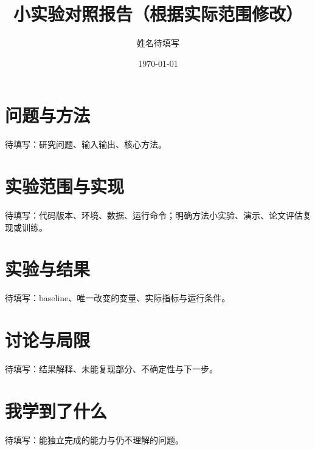 \documentclass[UTF8,11pt]{ctexart}
\title{小实验对照报告（根据实际范围修改）}
\author{姓名待填写}
\date{\today}
\begin{document}
\maketitle
\section{问题与方法} 待填写：研究问题、输入输出、核心方法。
\section{实验范围与实现} 待填写：代码版本、环境、数据、运行命令；明确方法小实验、演示、论文评估复现或训练。
\section{实验与结果} 待填写：baseline、唯一改变的变量、实际指标与运行条件。
\section{讨论与局限} 待填写：结果解释、未能复现部分、不确定性与下一步。
\section{我学到了什么} 待填写：能独立完成的能力与仍不理解的问题。
\end{document}
